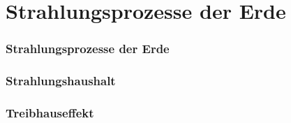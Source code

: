 \section{Strahlungsprozesse der Erde}

\begin{frame}
  \frametitle{Strahlungsprozesse der Erde}
\end{frame}

\begin{frame}
  \frametitle{Strahlungshaushalt}
\end{frame}

\begin{frame}
  \frametitle{Treibhauseffekt}
\end{frame}
